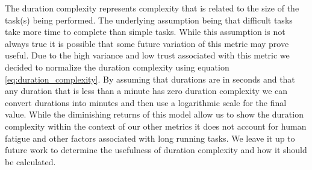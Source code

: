The duration complexity represents complexity that is related to the size of the task(s) being performed.  The underlying assumption being that difficult tasks take more time to complete than simple tasks.  While this assumption is not always true it is possible that some future variation of this metric may prove useful.  Due to the high variance and low trust associated with this metric we decided to normalize the duration complexity using equation \ref{eq:duration_complexity}.  By assuming that durations are in seconds and that any duration that is less than a minute has zero duration complexity we can convert durations into minutes and then use a logarithmic scale for the final value.  While the diminishing returns of this model allow us to show the duration complexity within the context of our other metrics it does not account for human fatigue and other factors associated with long running tasks.  We leave it up to future work to determine the usefulness of duration complexity and how it should be calculated.



